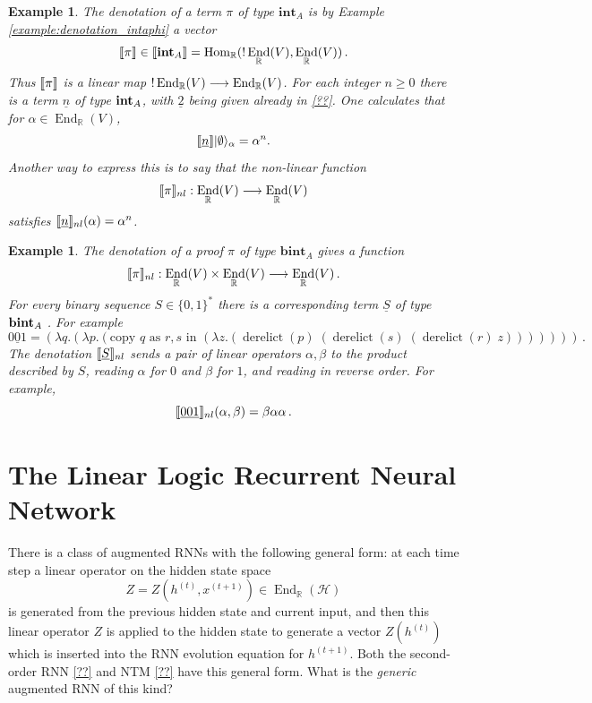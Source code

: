 \documentclass[english,letter paper,12pt,leqno]{article}
\theoremstyle{example}
\newtheorem{example}[theorem]{Example}
\numberwithin{equation}{section}
\def\Hom{\operatorname{Hom}}
\DeclareMathOperator{\End}{End}
\DeclareMathOperator{\derelict}{derelict}
\begin{document}
\begin{example}\label{example_1} The denotation of a term $\pi$ of type $\textbf{int}_A$ is by Example \ref{example:denotation_intaphi} a vector
\[
\den{\pi} \in \den{\inta_A} = \Hom_{\mathbb{R}}( {!} \End_{\mathbb{R}}(V), \End_{\mathbb{R}}(V))\,.
\]
Thus $\llbracket \pi \rrbracket$ is a linear map ${!} \End_{\mathbb{R}}(V) \lto \End_{\mathbb{R}}(V)$. For each integer $n \ge 0$ there is a term $\underline{n}$ of type $\textbf{int}_A$, with $\underline{2}$ being given already in \eqref{??}. One calculates that for $\alpha \in \End_{\mathbb{R}}(V)$,
\[
\llbracket \underline{n} \rrbracket \lvert\emptyset\rangle_\alpha = \alpha^n.
\]
Another way to express this is to say that the non-linear function
\[
\den{\pi}_{nl}: \End_{\mathbb{R}}(V) \lto \End_{\mathbb{R}}(V)
\]
satisfies $\llbracket \underline{n} \rrbracket_{nl}(\alpha) = \alpha^n$. %
\end{example}

\begin{example}\label{example_2} The denotation of a proof $\pi$ of type $\textbf{bint}_A$ gives a function
\[
\den{\pi}_{nl}: \End_{\mathbb{R}}(V) \times \End_{\mathbb{R}}(V) \lto \End_{\mathbb{R}}(V)\,.
\]
For every binary sequence $S \in \{0,1\}^*$ there is a corresponding term $\underline{S}$ of type $\textbf{bint}_A$ \cite[\S 3.2]{murfetclift}. For example
\[
\underline{001} = (\lambda q.(\lambda p.(\textrm{copy $q$ as $r,s$ in } (\lambda z.(\derelict(p)\;(\derelict(s)\;(\derelict(r)\;z)))))))\,.
\]
The denotation $\llbracket \underline{S} \rrbracket_{nl}$ sends a pair of linear operators $\alpha,\beta$ to the product described by $S$, reading $\alpha$ for $0$ and $\beta$ for $1$, and reading in reverse order. For example,
\[
\llbracket \underline{001} \rrbracket_{nl}(\alpha,\beta) = \beta \alpha \alpha\,.
\]
\end{example}

\section{The Linear Logic Recurrent Neural Network}

There is a class of augmented RNNs with the following general form: at each time step a linear operator on the hidden state space
\[
Z = Z(h^{(t)}, x^{(t+1)}) \in \End_{\mathbb{R}}(\mathscr{H})
\]
is generated from the previous hidden state and current input, and then this linear operator $Z$ is applied to the hidden state to generate a vector $Z(h^{(t)})$ which is inserted into the RNN evolution equation for $h^{(t+1)}$. Both the second-order RNN \eqref{??} and NTM \eqref{??} have this general form. What is the \emph{generic} augmented RNN of this kind? 
\end{document}

